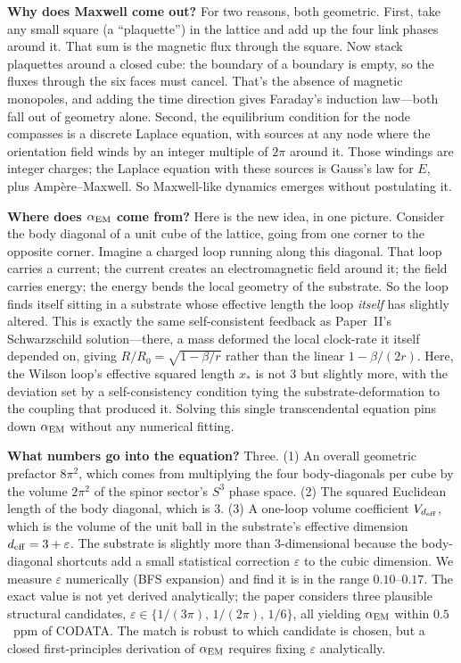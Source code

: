 \documentclass[11pt,a4paper]{article}
\begin{document}
\textbf{Why does Maxwell come out?} For two reasons, both
geometric. First, take any small square (a ``plaquette'') in
the lattice and add up the four link phases around it. That
sum is the magnetic flux through the square. Now stack
plaquettes around a closed cube: the boundary of a boundary is
empty, so the fluxes through the six faces must cancel. That's
the absence of magnetic monopoles, and adding the time
direction gives Faraday's induction law---both fall out of
geometry alone. Second, the equilibrium condition for the node
compasses is a discrete Laplace equation, with sources at any
node where the orientation field winds by an integer multiple
of $2\pi$ around it. Those windings are integer charges; the
Laplace equation with these sources is Gauss's law for $E$,
plus Amp\`ere--Maxwell. So Maxwell-like dynamics emerges
without postulating it.

\textbf{Where does $\alpha_{\rm EM}$ come from?} Here is the
new idea, in one picture. Consider the body diagonal of a unit
cube of the lattice, going from one corner to the opposite
corner. Imagine a charged loop running along this diagonal.
That loop carries a current; the current creates an
electromagnetic field around it; the field carries energy; the
energy bends the local geometry of the substrate. So the loop
finds itself sitting in a substrate whose effective length the
loop \emph{itself} has slightly altered. This is exactly the
same self-consistent feedback as Paper~II's Schwarzschild
solution---there, a mass deformed the local clock-rate it
itself depended on, giving $R/R_0 = \sqrt{1 - \beta/r}$ rather
than the linear $1 - \beta/(2r)$. Here, the Wilson loop's
effective squared length $x_*$ is not 3 but slightly more, with
the deviation set by a self-consistency condition tying the
substrate-deformation to the coupling that produced it. Solving
this single transcendental equation pins down $\alpha_{\rm EM}$
without any numerical fitting.

\textbf{What numbers go into the equation?} Three. (1) An
overall geometric prefactor $8\pi^2$, which comes from
multiplying the four body-diagonals per cube by the volume
$2\pi^2$ of the spinor sector's $S^3$ phase space. (2) The
squared Euclidean length of the body diagonal, which is 3.
(3) A one-loop volume coefficient $V_{d_{\rm eff}}$, which is
the volume of the unit ball in the substrate's effective
dimension $d_{\rm eff} = 3 + \varepsilon$. The substrate is
slightly more than 3-dimensional because the body-diagonal
shortcuts add a small statistical correction $\varepsilon$ to
the cubic dimension. We measure $\varepsilon$ numerically (BFS
expansion) and find it is in the range $0.10\text{--}0.17$. The
exact value is not yet derived analytically; the paper considers
three plausible structural candidates, $\varepsilon \in
\{1/(3\pi),\,1/(2\pi),\,1/6\}$, all yielding $\alpha_{\rm EM}$
within $0.5$~ppm of CODATA. The match is robust to which
candidate is chosen, but a closed first-principles derivation
of $\alpha_{\rm EM}$ requires fixing $\varepsilon$ analytically.
\end{document}
